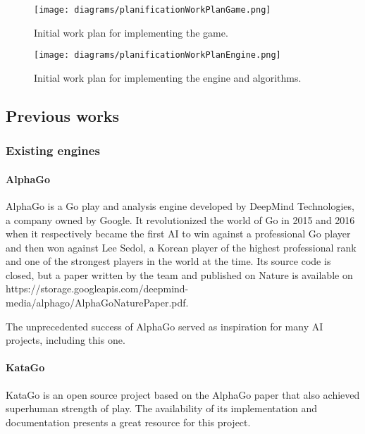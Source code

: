 \begin{figure}[h]
	\begin{center}
		\texttt{[image: diagrams/planificationWorkPlanGame.png]}
		\caption{Initial work plan for implementing the game.
		}\label{fig:planificationWorkPlanGame}
	\end{center}
\end{figure}

\begin{figure}[h]
	\begin{center}
		\texttt{[image: diagrams/planificationWorkPlanEngine.png]}
		\caption{Initial work plan for implementing the engine and algorithms.
		}\label{fig:planificationWorkPlanEngine}
	\end{center}
\end{figure}

\subsection{Previous works}

\subsubsection{Existing engines}

\paragraph{AlphaGo}

AlphaGo is a Go play and analysis engine developed by DeepMind Technologies, a
company owned by Google. It revolutionized the world of Go in 2015 and 2016 when
it respectively became the first AI to win against a professional Go player and
then won against Lee Sedol, a Korean player of the highest professional rank and
one of the strongest players in the world at the time. Its source code is
closed, but a paper \parencite{natureAlphaGo2016} written by the team and
published on Nature is available on
https://storage.googleapis.com/deepmind-media/alphago/AlphaGoNaturePaper.pdf.

The unprecedented success of AlphaGo served as inspiration for many AI projects,
including this one.

\paragraph{KataGo}

KataGo is an open source project based on the AlphaGo paper that also achieved
superhuman strength of play. The availability of its implementation and
documentation presents a great resource for this project.

